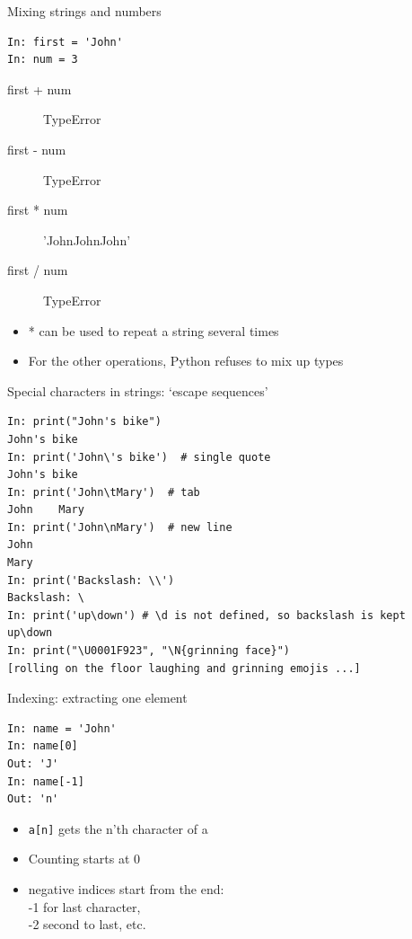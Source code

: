 \documentclass[aspectratio=169,usenames,dvipsnames]{beamer}
\begin{document}
\begin{frame}[fragile]{Mixing strings and numbers}
\begin{lstlisting}
In: first = 'John'
In: num = 3
\end{lstlisting}
\begin{description}
    \item[first + num] TypeError
    \item[first - num] TypeError
    \item[first * num] 'JohnJohnJohn'
    \item[first / num] TypeError
\end{description}

\begin{itemize}
\item * can be used to repeat a string several times
\item For the other operations, Python refuses to mix up types
\end{itemize}
\end{frame}

\begin{frame}[fragile]{Special characters in strings: `escape sequences'}
\begin{lstlisting}
In: print("John's bike")
John's bike
In: print('John\'s bike')  # single quote
John's bike
In: print('John\tMary')  # tab
John    Mary
In: print('John\nMary')  # new line
John
Mary
In: print('Backslash: \\')
Backslash: \
In: print('up\down') # \d is not defined, so backslash is kept
up\down
In: print("\U0001F923", "\N{grinning face}") 
[rolling on the floor laughing and grinning emojis ...]
\end{lstlisting}
\end{frame}

\begin{frame}[fragile]{Indexing: extracting one element}
\begin{lstlisting}
In: name = 'John'
In: name[0]
Out: 'J'
In: name[-1]
Out: 'n'
\end{lstlisting}
    \begin{itemize}
        \item \texttt{a[n]} gets the n'th character of a
        \item Counting starts at 0
        \item negative indices start from the end:\\
			-1 for last character, \\
            -2 second to last, etc.
    \end{itemize}
\end{frame}
\end{document}
